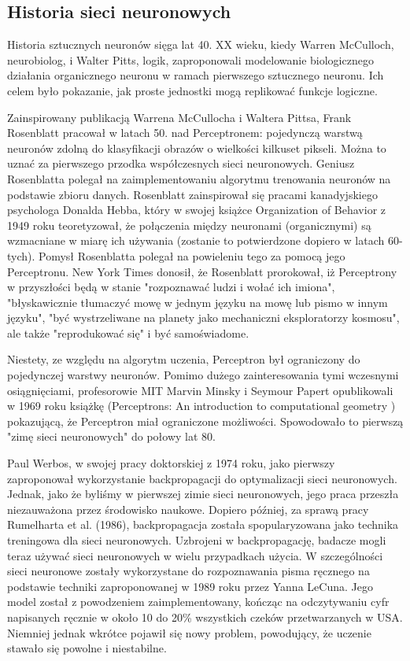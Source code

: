 \documentclass{article}
\begin{document}
\subsection{Historia sieci neuronowych}


Historia sztucznych neuronów sięga lat 40. XX wieku, kiedy Warren McCulloch, neurobiolog, i Walter Pitts, logik, zaproponowali modelowanie biologicznego działania organicznego neuronu w ramach pierwszego sztucznego neuronu.
Ich celem było pokazanie, jak proste jednostki mogą replikować funkcje logiczne.


Zainspirowany publikacją Warrena McCullocha i Waltera Pittsa, Frank Rosenblatt pracował w latach 50. nad Perceptronem: pojedynczą warstwą neuronów zdolną do klasyfikacji obrazów o wielkości kilkuset pikseli.
Można to uznać za pierwszego przodka współczesnych sieci neuronowych.
Geniusz Rosenblatta polegał na zaimplementowaniu algorytmu trenowania neuronów na podstawie zbioru danych.
Rosenblatt zainspirował się pracami kanadyjskiego psychologa Donalda Hebba, który w swojej książce Organization of Behavior z 1949 roku teoretyzował, że połączenia między neuronami (organicznymi) są wzmacniane w miarę ich używania (zostanie to potwierdzone dopiero w latach 60-tych).
Pomysł Rosenblatta polegał na powieleniu tego za pomocą jego Perceptronu.
New York Times donosił, że Rosenblatt prorokował, iż Perceptrony w przyszłości będą w stanie "rozpoznawać ludzi i wołać ich imiona", "błyskawicznie tłumaczyć mowę w jednym języku na mowę lub pismo w innym języku", "być wystrzeliwane na planety jako mechaniczni eksploratorzy kosmosu", ale także "reprodukować się" i być samoświadome.

Niestety, ze względu na algorytm uczenia, Perceptron był ograniczony do pojedynczej warstwy neuronów.
Pomimo dużego zainteresowania tymi wczesnymi osiągnięciami, profesorowie MIT Marvin Minsky i Seymour Papert opublikowali w 1969 roku książkę (Perceptrons: An introduction to computational geometry ) pokazującą, że Perceptron miał ograniczone możliwości.
Spowodowało to pierwszą "zimę sieci neuronowych" do połowy lat 80.

Paul Werbos, w swojej pracy doktorskiej z 1974 roku, jako pierwszy zaproponował wykorzystanie backpropagacji do optymalizacji sieci neuronowych.
Jednak, jako że byliśmy w pierwszej zimie sieci neuronowych, jego praca przeszła niezauważona przez środowisko naukowe.
Dopiero później, za sprawą pracy Rumelharta et al. (1986), backpropagacja została spopularyzowana jako technika treningowa dla sieci neuronowych.
Uzbrojeni w backpropagację, badacze mogli teraz używać sieci neuronowych w wielu przypadkach użycia.
W szczególności sieci neuronowe zostały wykorzystane do rozpoznawania pisma ręcznego na podstawie techniki zaproponowanej w 1989 roku przez Yanna LeCuna.
Jego model został z powodzeniem zaimplementowany, kończąc na odczytywaniu cyfr napisanych ręcznie w około 10 do 20\% wszystkich czeków przetwarzanych w USA.
Niemniej jednak wkrótce pojawił się nowy problem, powodujący, że uczenie stawało się powolne i niestabilne.
\end{document}
